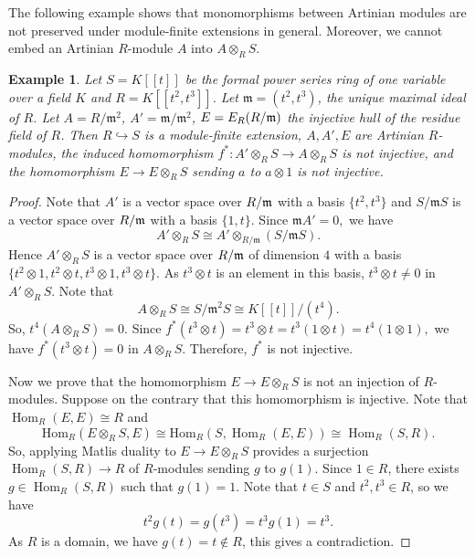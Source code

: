 \documentclass[a4papersize]{article}
\newtheorem{example}[theorem]{Example}
\DeclareMathOperator{\Hom}{Hom}
\begin{document}
{The following example shows that monomorphisms between Artinian modules are not preserved under  module-finite extensions in general.  Moreover, we cannot embed an Artinian $R$-module $A$ into $A\otimes_RS$.  
 
\begin{example} \label{E:1} {\rm Let $S=K[[t]]$ be the formal power series ring of one variable over a field $K$ and $R=K[[t^2, t^3]]$. Let $\mathfrak{m}=(t^2, t^3)$, the unique maximal ideal of $R$. Let   $A=R/\mathfrak{m}^2$, $A'=\mathfrak{m}/\mathfrak{m}^2$, $E= E_R(R/\frak m)$ the injective hull of the residue field of $R$. 
Then $R\hookrightarrow S$ is a module-finite extension, $A, A', E$ are Artinian $R$-modules, the induced homomorphism $f^*: A'\otimes_R S\to A\otimes_R S$   is not injective, and the homomorphism $E\to E\otimes_RS$ sending $a$ to $a\otimes 1$ is not  injective}.
\end{example}

\begin{proof} Note that $A'$ is a vector space over  $R/\frak m$ with a basis $\{t^2, t^3\}$ and  $S/\mathfrak{m}S$ is a vector space over  $R/\frak m$ with a basis $\{1, t\}$. Since $\mathfrak{m}A'=0,$ we have $$A' \otimes_RS \cong A' \otimes_{R/\mathfrak{m}} (S/\mathfrak{m}S).$$ Hence   $A' \otimes_R S$ is a vector space over  $R/\frak m$ of dimension  $4$ with a basis $\{t^2 \otimes 1, t^2 \otimes t, t^3 \otimes 1, t^3 \otimes t\}$. As $t^3 \otimes t$ is an element in  this  basis, $t^3 \otimes t \neq 0$ in  $A' \otimes_R S$. Note that    
$$A \otimes_R S \cong S/\mathfrak{m}^2 S\cong K[[t]]/(t^4).$$ So, $t^4(A \otimes_R S)=0$. Since  $f^*(t^3 \otimes t) = t^3 \otimes t = t^3(1\otimes t)=t^4(1\otimes 1),$ we have $f^*(t^3 \otimes t)=0$ in $A \otimes_R S.$ Therefore, $f^*$ is not injective.

Now we prove that the homomorphism $E \to E \otimes_R S$ is not an injection of $R$-modules. Suppose on the contrary that this homomorphism  is injective. Note that  $\Hom_R(E, E)\cong  R$ and $$\text{Hom}_R(E \otimes_R S, E)\cong \text{Hom}_R(S, \Hom_R(E, E))\cong \Hom_R(S, R).$$ So, applying Matlis duality to $E \to E \otimes_R S$   provides a surjection $\Hom_R(S, R) \to R$ of $R$-modules sending $g$ to $g(1).$  Since $1\in R$, there exists   $g \in \Hom_R(S, R)$ such that $g(1)=1.$  Note that $t\in S$ and $t^2, t^3\in R$, so we have
$$t^2 g(t) = g(t^3) = t^3 g(1) = t^3.$$ As $R$ is a domain, we have $g(t) = t\notin R$, this gives a contradiction. 
\end{proof}
 		
}
\end{document}
